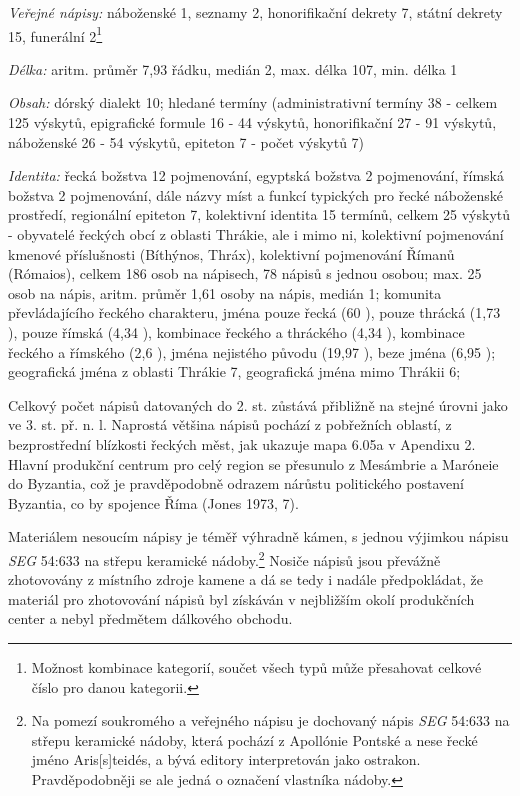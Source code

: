 {\em Veřejné nápisy:} náboženské 1, seznamy 2, honorifikační dekrety 7, státní dekrety 15, funerální 2\footnote{Možnost kombinace kategorií, součet všech typů může přesahovat celkové číslo pro danou kategorii.}

{\em Délka:} aritm. průměr 7,93 řádku, medián 2, max. délka 107, min. délka 1

{\em Obsah:} dórský dialekt 10; hledané termíny (administrativní termíny 38 - celkem 125 výskytů, epigrafické formule 16 - 44 výskytů, honorifikační 27 - 91 výskytů, náboženské 26 - 54 výskytů, epiteton 7 - počet výskytů 7)

{\em Identita:} řecká božstva 12 pojmenování, egyptská božstva 2 pojmenování, římská božstva 2 pojmenování, dále názvy míst a funkcí typických pro řecké náboženské prostředí, regionální epiteton 7, kolektivní identita 15 termínů, celkem 25 výskytů - obyvatelé řeckých obcí z oblasti Thrákie, ale i mimo ni, kolektivní pojmenování kmenové příslušnosti (Bíthýnos, Thráx), kolektivní pojmenování Římanů (Rómaios), celkem 186 osob na nápisech, 78 nápisů s jednou osobou; max. 25 osob na nápis, aritm. průměr 1,61 osoby na nápis, medián 1; komunita převládajícího řeckého charakteru, jména pouze řecká (60 ), pouze thrácká (1,73 ), pouze římská (4,34 ), kombinace řeckého a thráckého (4,34 ), kombinace řeckého a římského (2,6 ), jména nejistého původu (19,97 ), beze jména (6,95 ); geografická jména z oblasti Thrákie 7, geografická jména mimo Thrákii 6;

\NC\AR
\HL
\HL
\stoptable

Celkový počet nápisů datovaných do 2. st. zůstává přibližně na stejné úrovni jako ve 3. st. př. n. l. Naprostá většina nápisů pochází z pobřežních oblastí, z bezprostřední blízkosti řeckých měst, jak ukazuje mapa 6.05a v Apendixu 2. Hlavní produkční centrum pro celý region se přesunulo z Mesámbrie a Maróneie do Byzantia, což je pravděpodobně odrazem nárůstu politického postavení Byzantia, co by spojence Říma (Jones 1973, 7).

Materiálem nesoucím nápisy je téměř výhradně kámen, s jednou výjimkou nápisu {\em SEG} 54:633 na střepu keramické nádoby.\footnote{Na pomezí soukromého a veřejného nápisu je dochovaný nápis {\em SEG} 54:633 na střepu keramické nádoby, která pochází z Apollónie Pontské a nese řecké jméno Aris{[}s{]}teidés, a bývá editory interpretován jako ostrakon. Pravděpodobněji se ale jedná o označení vlastníka nádoby.} Nosiče nápisů jsou převážně zhotovovány z místního zdroje kamene a dá se tedy i nadále předpokládat, že materiál pro zhotovování nápisů byl získáván v nejbližším okolí produkčních center a nebyl předmětem dálkového obchodu.

